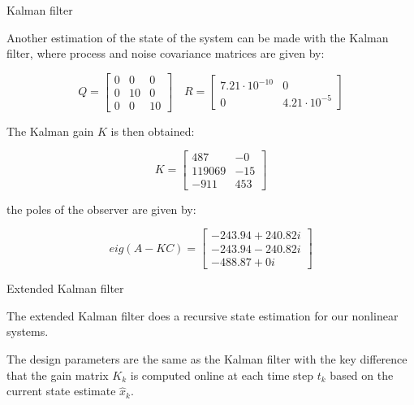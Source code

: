 \begin{frame}{Kalman filter}

    Another estimation of the state of the system can be made with the Kalman filter, where process and noise covariance matrices are given by:

    \begin{equation}
        Q = \begin{bmatrix}
            0 & 0  & 0  \\
            0 & 10 & 0  \\
            0 & 0  & 10
        \end{bmatrix}
        \quad
        R = \begin{bmatrix}
            7.21 \cdot 10^{-10} & 0                  \\
            0                   & 4.21 \cdot 10^{-5}
        \end{bmatrix}
    \end{equation}

    The Kalman gain $K$ is then obtained:

    \begin{equation}
        K = \begin{bmatrix}
            487    & -0  \\
            119069 & -15 \\
            -911   & 453
        \end{bmatrix}
        \label{eq:kalman_gain_matrix}
    \end{equation}

    the poles of the observer are given by:

    \begin{equation}
        eig(A - K C) =
        \begin{bmatrix}
            -243.94 + 240.82i \\
            -243.94 - 240.82i \\
            -488.87 + 0i
        \end{bmatrix}
        \label{eq:K_kalman}
    \end{equation}

\end{frame}



\begin{frame}{Extended Kalman filter}

    The extended Kalman filter does a recursive state estimation for our nonlinear systems.

    \vspace{9pt}

    The design parameters are the same as the Kalman filter with the key difference that the gain matrix $K_k$ is computed online at each time step $t_k$ based on the current state estimate $\hat{x}_k$.

\end{frame}